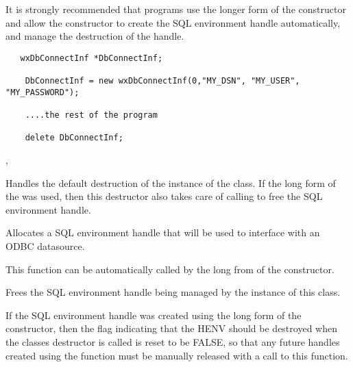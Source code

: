 
It is strongly recommended that programs use the longer form of the 
constructor and allow the constructor to create the SQL environment handle 
automatically, and manage the destruction of the handle.


\begin{verbatim}
   wxDbConnectInf *DbConnectInf;

	DbConnectInf = new wxDbConnectInf(0,"MY_DSN", "MY_USER", "MY_PASSWORD");

	....the rest of the program

	delete DbConnectInf;
\end{verbatim}


, 


\label{wxdbconnectinfdestr}


Handles the default destruction of the instance of the class.  If the long form 
of the  was used, then this destructor 
also takes care of calling 
 to free the 
SQL environment handle.


\label{wxdbconnectinfallochenv}


Allocates a SQL environment handle that will be used to interface with 
an ODBC datasource.


This function can be automatically called by the long from of the 
 constructor.


\label{wxdbconnectinffreehenv}


Frees the SQL environment handle being managed by the instance of this class.


If the SQL environment handle was created using the long form of the 
 constructor, then the flag indicating 
that the HENV should be destroyed when the classes destructor is called 
is reset to be FALSE, so that any future handles created using the 
 function 
must be manually released with a call to this function.


